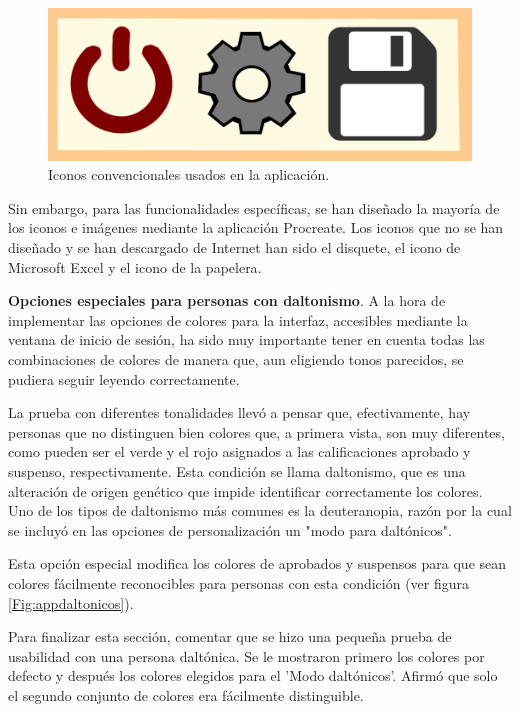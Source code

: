 \begin{figure}[h]
\centering\includegraphics[width=0.5\linewidth]{figs/iconosusados.png}
\caption{Iconos convencionales usados en la aplicación.}
\label{Fig:iconosusados}
\end{figure}

Sin embargo, para las funcionalidades específicas, se han diseñado la mayoría de los iconos e imágenes mediante la aplicación Procreate. Los iconos que no se han diseñado y se han descargado de Internet han sido el disquete\cite{disquete}, el icono de Microsoft Excel\cite{excelicon} y el icono de la papelera\cite{iconsforfree}.

\textbf{Opciones especiales para personas con daltonismo}.
A la hora de implementar las opciones de colores para la interfaz, accesibles mediante la ventana de inicio de sesión, ha sido muy importante tener en cuenta todas las combinaciones de colores de manera que, aun eligiendo tonos parecidos, se pudiera seguir leyendo correctamente.

La prueba con diferentes tonalidades llevó a pensar que, efectivamente, hay personas que no distinguen bien colores que, a primera vista, son muy diferentes, como pueden ser el verde y el rojo asignados a las calificaciones aprobado y suspenso, respectivamente. Esta condición se llama daltonismo, que es una alteración de origen genético que impide identificar correctamente los colores. Uno de los tipos de daltonismo más comunes es la deuteranopia, razón por la cual se incluyó en las opciones de personalización un "modo para daltónicos".

Esta opción especial modifica los colores de aprobados y suspensos para que sean colores fácilmente reconocibles para personas con esta condición (ver figura \ref{Fig:appdaltonicos}).

Para finalizar esta sección, comentar que se hizo una pequeña prueba de usabilidad con una persona daltónica. Se le mostraron primero los colores por defecto y después los colores elegidos para el 'Modo daltónicos'. Afirmó que solo el segundo conjunto de colores era fácilmente distinguible.
\newpage

